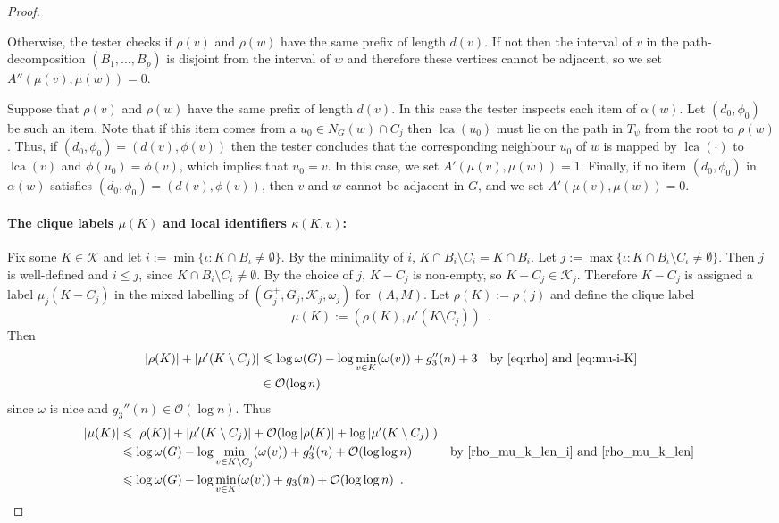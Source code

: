 \documentclass{patmorin}
\renewcommand{\le}{\leqslant}
\DeclareMathOperator{\lca}{lca}
\newcommand{\Oh}{\mathcal{O}}
\let\eqref\cref
\begin{document}
\begin{proof}
\begin{itemize}
       Otherwise, the tester checks if $\rho(v)$ and $\rho(w)$ have the same prefix of length $d(v)$.
       If not then the interval of $v$ in the path-decomposition $(B_1,\ldots,B_p)$ is disjoint from the interval of $w$ and therefore these vertices cannot be adjacent, so we set $A''(\mu(v),\mu(w))=0$.

       Suppose that $\rho(v)$ and $\rho(w)$ have the same prefix of length $d(v)$.
       In this case the tester inspects each item of $\alpha(w)$. Let $(d_0,\phi_0)$ be such an item. Note that if this item comes from a $u_0\in N_G(w)\cap C_j$ then
       $\lca(u_0)$ must lie on the path in $T_{\psi}$ from the root to $\rho(w)$.
       Thus, if $(d_0,\phi_0)=(d(v),\phi(v))$ then the tester concludes that the corresponding neighbour $u_0$ of $w$ is mapped by $\lca(\cdot)$ to $\lca(v)$ and $\phi(u_0)=\phi(v)$, which implies that $u_0=v$. In this case, we set $A'(\mu(v),\mu(w))=1$.
       Finally, if no item $(d_0,\phi_0)$ in $\alpha(w)$ satisfies $(d_0,\phi_0)=(d(v),\phi(v))$, then $v$ and $w$ cannot be adjacent in $G$, and we set $A'(\mu(v),\mu(w))=0$.
     \end{itemize}



    \paragraph{\boldmath The clique labels $\mu(K)$ and local identifiers $\kappa(K,v)$:}
    Fix some $K\in\mathcal{K}$ and let $i:=\min\{\iota:K\cap B_\iota\neq\emptyset\}$.
    By the minimality of $i$, $K\cap B_i\setminus C_i=K\cap B_i$. Let $j:=\max\{\iota:K\cap B_\iota\setminus C_\iota\neq\emptyset\}$.
    Then $j$ is well-defined and $i\le j$, since $K\cap B_i\setminus C_i\neq\emptyset$.
    By the choice of $j$, $K-C_j$ is non-empty, so $K-C_j\in\mathcal{K}_j$.
    Therefore $K-C_j$ is assigned a label $\mu_j(K-C_j)$ in the mixed labelling of $(G^+_j,G_j,\mathcal{K}_j,\omega_j)$ for $(A,M)$.
    Let $\rho(K):=\rho(j)$ and define the clique label
    \[
        \mu(K):=(\rho(K),\mu'(K\setminus C_j)) \enspace .
    \]
    Then
    \begin{align}
       |\rho(K)|+|\mu'(K\setminus C_j)|
       & \le \log\omega(G)-\log\min_{v\in K}(\omega(v))+g_3''(n)+3&&\textrm{by~\eqref{eq:rho} and~\eqref{eq:mu-i-K}}  \label{rho_mu_k_len_i} \\
       & \in \Oh(\log n)
       \label{rho_mu_k_len}
    \end{align}
    since $\omega$ is nice and $g_3''(n)\in\Oh(\log n)$.  Thus
    \begin{align*}
        |\mu(K)|
        & \le |\rho(K)|+|\mu'(K\setminus C_j)| + \Oh(\log|\rho(K)|+\log|\mu'(K\setminus C_j)|) \\
        & \le \log\omega(G)-\log\min_{v\in K\setminus C_j}(\omega(v)) + g''_3(n)+\Oh(\log\log n) & \text{by \eqref{rho_mu_k_len_i} and \eqref{rho_mu_k_len} } \\
        & \le \log\omega(G)-\log\min_{v\in K}(\omega(v)) + g_3(n)+\Oh(\log\log n) \enspace .
    \end{align*}


\end{proof}
\end{document}
